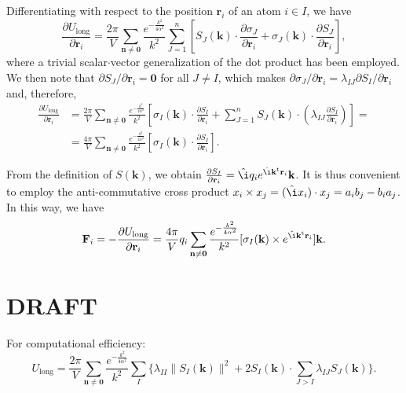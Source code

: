 \documentclass[11pt]{article}
\newcommand{\vt}[1]{\boldsymbol{\mathbf{#1}}}           %
\newcommand{\tr}[1]{#1^\text{t}}                        %
\newcommand{\im}{\hat{\i}}                              %
\begin{document}
Differentiating with respect to the position $\vt r_i$ of an atom $i \in I$, we have
\begin{equation*}
\frac{\partial U_\text{long}}{\partial \vt r_i} = \frac{2\pi}{V}\sum_{\vt n \neq \vt 0} \frac{e^{-\frac{k^2}{4\alpha^2}}}{k^2} \sum_{J=1}^n \left[ S_J(\vt k) \cdot \frac{\partial \sigma_J}{\partial \vt r_i} + \sigma_J(\vt k) \cdot \frac{\partial S_J}{\partial \vt r_i}\right],
\end{equation*}
where a trivial scalar$\cdot$vector generalization of the dot product has been employed. We then note that $\partial S_J / \partial \vt r_i = \vt 0$ for all $J \neq I$, which makes $\partial \sigma_J / \partial \vt r_i = \lambda_{IJ} {\partial S_I}/{\partial \vt r_i}$ and, therefore,
\begin{align*}
\frac{\partial U_\text{long}}{\partial \vt r_i} &= \frac{2\pi}{V}\sum_{\vt n \neq \vt 0} \frac{e^{-\frac{k^2}{4\alpha^2}}}{k^2} \left[ \sigma_I(\vt k) \cdot \frac{\partial S_I}{\partial \vt r_i} + \sum_{J=1}^n S_J(\vt k) \cdot \left( \lambda_{IJ} \frac{\partial S_I}{\partial \vt r_i} \right) \right] = \\
&= \frac{4\pi}{V}\sum_{\vt n \neq \vt 0} \frac{e^{-\frac{k^2}{4\alpha^2}}}{k^2} \left[ \sigma_I(\vt k) \cdot \frac{\partial S_I}{\partial \vt r_i} \right].
\end{align*}

From the definition of $S(\vt k)$, we obtain $\frac{\partial S_I}{\partial \vt r_i} = \im q_i e^{\im \tr{\vt k}{\vt r}_i} \vt k$. It is thus convenient to employ the anti-commutative cross product $x_i \times x_j = (\im x_i) \cdot x_j = a_ib_j- b_ia_j$. In this way, we have
\begin{equation*}
{\vt F}_i = -\frac{\partial U_\text{long}}{\partial \vt r_i} = \frac{4\pi}{V} q_i \sum_{\vt n \neq \vt 0} \frac{e^{-\frac{k^2}{4\alpha^2}}}{k^2} [ \sigma_I(\vt k) \times e^{\im \tr{\vt k}{\vt r}_i} ]{\vt k}.
\end{equation*}

\section{DRAFT}

For computational efficiency:
\begin{equation*}
U_\text{long} = \frac{2\pi}{V}\sum_{\vt n \neq \vt 0} \frac{e^{-\frac{k^2}{4\alpha^2}}}{k^2} \sum_I \bigg\{\lambda_{II} \|S_I(\vt k)\|^2 + 2 S_I(\vt k) \cdot \sum_{J > I} \lambda_{IJ} S_J(\vt k)\bigg\}.
\end{equation*}
\end{document}
